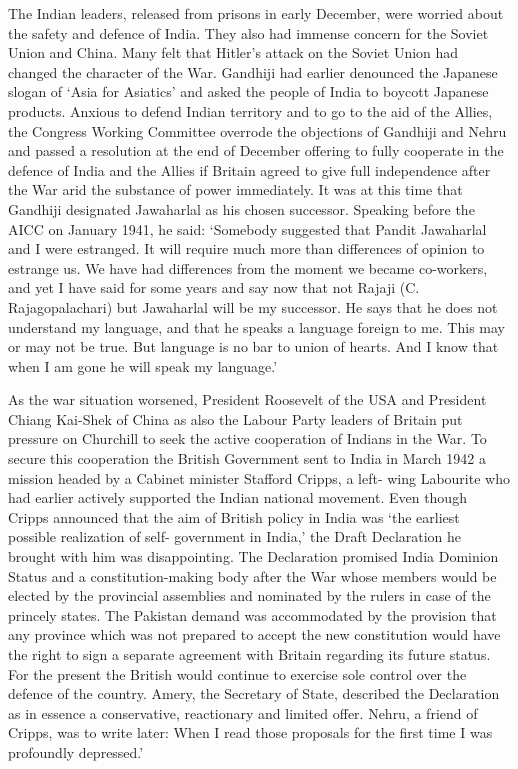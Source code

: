 \begin{multicols}{2}
The Indian leaders, released from prisons in early December, were worried about the safety and defence of India. They also had immense concern for the Soviet Union and China. Many felt that Hitler's attack on the Soviet Union had changed the character of the War. Gandhiji had earlier denounced the Japanese slogan of `Asia for Asiatics' and asked the people of India to boycott Japanese products. Anxious to defend Indian territory and to go to the aid of the Allies, the Congress Working Committee overrode the objections of Gandhiji and Nehru and passed a resolution at the end of December offering to fully cooperate in the defence of India and the Allies if Britain agreed to give full independence after the War arid the substance of power immediately. It was at this time that Gandhiji designated Jawaharlal as his chosen successor. Speaking before the AICC on January 1941, he said: `Somebody suggested that Pandit Jawaharlal and I were estranged. It will require much more than differences of opinion to estrange us. We have had differences from the moment we became co-workers, and yet I have said for some years and say now that not Rajaji (C. Rajagopalachari) but Jawaharlal will be my successor. He says that he does not understand my language, and that he speaks a language foreign to me. This may or may not be true. But language is no bar to union of hearts. And I know that when I am gone he will speak my language.' 

As the war situation worsened, President Roosevelt of the USA and President Chiang Kai-Shek of China as also the Labour Party leaders of Britain put pressure on Churchill to seek the active cooperation of Indians in the War. To secure this cooperation the British Government sent to India in March 1942 a mission headed by a Cabinet minister Stafford Cripps, a left- wing Labourite who had earlier actively supported the Indian national movement. Even though Cripps announced that the aim of British policy in India was `the earliest possible realization of self- government in India,' the Draft Declaration he brought with him was disappointing. The Declaration promised India Dominion Status and a constitution-making body after the War whose members would be elected by the provincial assemblies and nominated by the rulers in case of the princely states. The Pakistan demand was accommodated by the provision that any province which was not prepared to accept the new constitution would have the right to sign a separate agreement with Britain regarding its future status. For the present the British would continue to exercise sole control over the defence of the country. Amery, the Secretary of State, described the Declaration as in essence a conservative, reactionary and limited offer. Nehru, a friend of Cripps, was to write later: When I read those proposals for the first time I was profoundly depressed.' 


\end{multicols}
